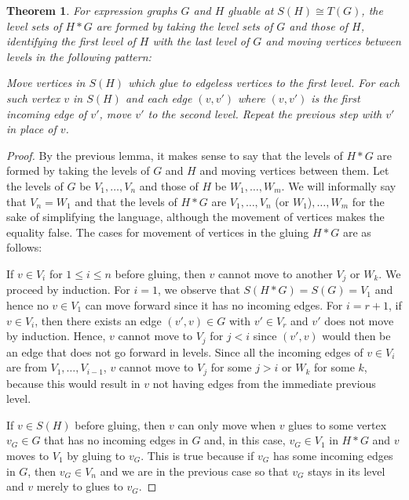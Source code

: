 \documentclass{amsart}
\newcommand{\li}[1][]{\ifthenelse{\equal{#1}{}}{\item}{\item \label{#1}}}
\newenvironment{enmrt}{
  \enumerate[(i)]
  \setlength{\itemsep}{0pt}
}{
  \endenumerate
}
\newtheorem{thm}{Theorem}
\numberwithin{thm}{section}
\theoremstyle{definition}
\begin{document}
\begin{thm}
For expression graphs $G$ and $H$ gluable at $S(H) \cong T(G)$,
the level sets of $H * G$ are formed by taking the level sets of $G$ and those
of $H$, identifying the first level of $H$ with the last level of $G$ and moving
vertices between levels in the following pattern:
\begin{enmrt}
\li Move vertices in $S(H)$ which glue to edgeless vertices to the first level.
\li For each such vertex $v$ in $S(H)$ and each edge $(v, v')$ where $(v, v')$
is the first incoming edge of $v'$, move $v'$ to the second level.
\li Repeat the previous step with $v'$ in place of $v$.
\end{enmrt}
\end{thm}
\begin{proof}
By the previous lemma, it makes sense to say that the levels of $H * G$ are
formed by taking the levels of
$G$ and $H$ and moving vertices between them. Let the levels of $G$ be $V_1,
\dots, V_n$ and those of $H$ be $W_1, \dots, W_m$. We will informally say that
$V_n = W_1$ and that the levels of $H * G$ are
$V_1, \dots, V_n $ (or $W_1$)$, \dots, W_m$ for the sake of simplifying the
language, although the movement of vertices makes the equality false. The cases
for movement of vertices in the gluing $H * G$ are as follows:
\begin{enmrt}
\li If $v \in V_i$ for $1 \leq i \leq n$ before gluing, then $v$ cannot move to
another $V_j$ or $W_k$.
We proceed by induction. For $i = 1$, we observe that $S(H * G) = S(G) = V_1$
and hence no $v \in V_1$ can move forward since it has no incoming edges. For
$i = r + 1$, if $v \in V_i$, then there exists an edge $(v', v) \in G$ with
$v' \in V_{r}$ and $v'$ does not move by induction. Hence, $v$ cannot move to
$V_j$ for $j < i$ since $(v', v)$ would then be an edge that does not go forward
in levels. Since all the incoming edges of $v \in V_i$ are from
$V_1, \dots, V_{i - 1}$, $v$ cannot move to $V_j$ for some $j > i$ or $W_k$ for
some $k$, because this would result in $v$ not having edges from the immediate
previous level.

\li If $v \in S(H)$ before gluing, then $v$ can only move when $v$ glues to some
vertex $v_G \in G$ that has no incoming edges in $G$ and, in this case,
$v_G \in V_1$ in $H * G$ and $v$ moves to $V_1$ by gluing to $v_G$. This is true
because if $v_G$ has some incoming edges in $G$, then $v_G \in V_n$ and we are
in the previous case so that $v_G$ stays in its level and $v$ merely to glues to
$v_G$.


\end{enmrt}
\end{proof}
\end{document}
